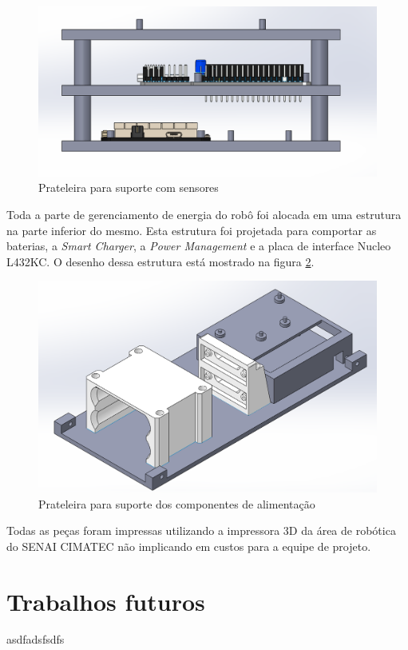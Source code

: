   \begin{figure}[h]
  	\centering
  	\includegraphics[width=16cm]{Figures/prateleiracsensores.png}
  	\caption{Prateleira para suporte com sensores} \label{Prateleiracsensor}
  \end{figure}
 

Toda a parte de gerenciamento de energia do robô foi alocada em uma estrutura na parte inferior do mesmo. Esta estrutura foi projetada para comportar as baterias, a \textit{Smart Charger}, a \textit{Power Management} e a placa de interface Nucleo L432KC. O desenho dessa estrutura está mostrado na figura \ref{pecaaliment}.

\begin{figure}[h]
	\centering
	\includegraphics[width=14cm]{Figures/pecadebaixo.png}
	\caption{Prateleira para suporte dos componentes de alimentação} \label{pecaaliment}
\end{figure}

Todas as peças foram impressas utilizando a impressora 3D da área de robótica do SENAI CIMATEC não implicando em custos para a equipe de projeto.


 
\section{Trabalhos futuros}
\label{sec:trabfut}
asdfadsfsdfs




